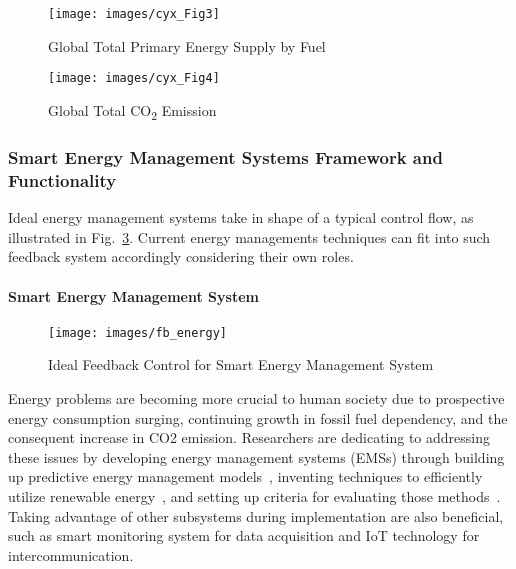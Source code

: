 \documentclass[letterpaper, twocolumn, 10pt, conference]{IEEEtran}
\begin{document}
\begin{figure}[h!]
        \centering
        \texttt{[image: images/cyx\_Fig3]}
        \caption{Global Total Primary Energy Supply by Fuel}
        \label{fig:cyx:fig3}
\end{figure}

\begin{figure}[h!]
        \centering
        \texttt{[image: images/cyx\_Fig4]}
        \caption{Global Total CO\textsubscript{2} Emission}
        \label{fig:cyx:fig4}
\end{figure}

\subsubsection{Smart Energy Management Systems Framework and Functionality}
\label{sssec:cyx:smart_energy:framework}

Ideal energy management systems take in shape of a typical control flow, as illustrated in Fig.~\ref{fig:cyx:smart_energy_feedback}. Current energy managements techniques can fit into such feedback system accordingly considering their own roles.

\paragraph{Smart Energy Management System}

\begin{figure}[h!]
        \centering
        \texttt{[image: images/fb\_energy]}
        \caption{Ideal Feedback Control for Smart Energy Management System}
        \label{fig:cyx:smart_energy_feedback}
\end{figure}

Energy problems are becoming more crucial to human society due to prospective energy consumption surging, continuing growth in fossil fuel dependency, and the consequent increase in CO2 emission. Researchers are dedicating to addressing these issues by developing energy management systems (EMSs) through building up predictive energy management models~\cite{lee2016energy, wang2017optimal, minoli2017iot, wang2017review}, inventing techniques to efficiently utilize renewable energy~\cite{khare2016solar, fernandez2017new, wang2017toward, feng2007design}, and setting up criteria for evaluating those methods~\cite{roulet2002orme, kumar2017review}. Taking advantage of other subsystems during implementation are also beneficial, such as smart monitoring system for data acquisition and IoT technology for intercommunication.
\end{document}
